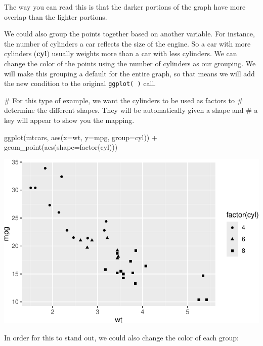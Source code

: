 \documentclass[
  letterpaper,
  DIV=11,
  numbers=noendperiod]{scrreprt}
\newenvironment{Shaded}{\begin{snugshade}}{\end{snugshade}}
\newcommand{\AttributeTok}[1]{\textcolor[rgb]{0.40,0.45,0.13}{#1}}
\newcommand{\CommentTok}[1]{\textcolor[rgb]{0.37,0.37,0.37}{#1}}
\newcommand{\FunctionTok}[1]{\textcolor[rgb]{0.28,0.35,0.67}{#1}}
\newcommand{\NormalTok}[1]{\textcolor[rgb]{0.00,0.23,0.31}{#1}}
\newcommand{\SpecialCharTok}[1]{\textcolor[rgb]{0.37,0.37,0.37}{#1}}
\begin{document}
The way you can read this is that the darker portions of the graph have
more overlap than the lighter portions.

We could also group the points together based on another variable. For
instance, the number of cylinders a car reflects the size of the engine.
So a car with more cylinders (\textbf{cyl}) usually weights more than a
car with less cylinders. We can change the color of the points using the
number of cylinders as our grouping. We will make this grouping a
default for the entire graph, so that means we will add the new
condition to the original \texttt{ggplot(\ )} call.

\begin{Shaded}
\begin{Highlighting}[]
\CommentTok{\# For this type of example, we want the cylinders to be used as factors to }
\CommentTok{\# determine the different shapes. They will be automatically given a shape and}
\CommentTok{\# a key will appear to show you the mapping.}

\FunctionTok{ggplot}\NormalTok{(mtcars, }\FunctionTok{aes}\NormalTok{(}\AttributeTok{x=}\NormalTok{wt, }\AttributeTok{y=}\NormalTok{mpg, }\AttributeTok{group=}\NormalTok{cyl)) }\SpecialCharTok{+}
  \FunctionTok{geom\_point}\NormalTok{(}\FunctionTok{aes}\NormalTok{(}\AttributeTok{shape=}\FunctionTok{factor}\NormalTok{(cyl)))}
\end{Highlighting}
\end{Shaded}

\includegraphics{Advanced_Scatterplot_Techniques_files/figure-pdf/unnamed-chunk-9-1.pdf}

In order for this to stand out, we could also change the color of each
group:
\end{document}
